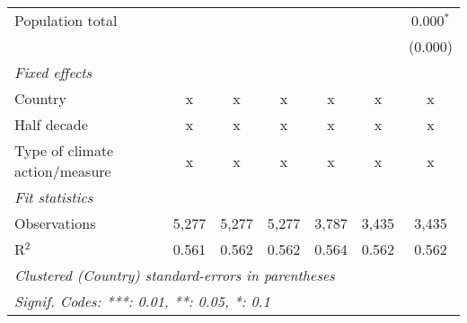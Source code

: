 \begin{tabular}{lcccccc}
   Population total                                                        &         &                &                &                &                & 0.000$^{*}$\\   
                                                                           &         &                &                &                &                & (0.000)\\   
   \emph{Fixed effects}\\
   Country                                                                 & x       & x              & x              & x              & x              & x\\  
   Half decade                                                             & x       & x              & x              & x              & x              & x\\  
   Type of climate action/measure                                          & x       & x              & x              & x              & x              & x\\  
   \midrule \emph{Fit statistics}\\
   Observations                                                            & 5,277   & 5,277          & 5,277          & 3,787          & 3,435          & 3,435\\  
   R$^2$                                                                   & 0.561   & 0.562          & 0.562          & 0.564          & 0.562          & 0.562\\  
   \midrule
   \multicolumn{7}{l}{\emph{Clustered (Country) standard-errors in parentheses}}\\
   \multicolumn{7}{l}{\emph{Signif. Codes: ***: 0.01, **: 0.05, *: 0.1}}\\
\end{tabular}
\par\endgroup


